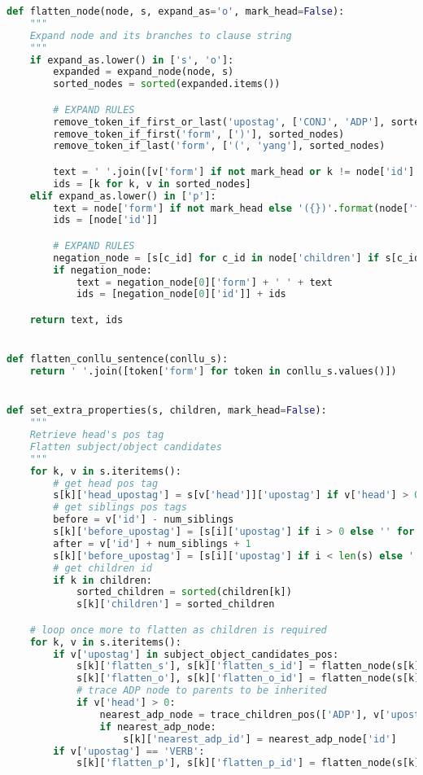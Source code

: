 \begin{lstlisting}[language=Python]
def flatten_node(node, s, expand_as='o', mark_head=False):
    """
    Expand node and its branches to clause string
    """
    if expand_as.lower() in ['s', 'o']:
        expanded = expand_node(node, s)
        sorted_nodes = sorted(expanded.items())

        # EXPAND RULES
        remove_token_if_first_or_last('upostag', ['CONJ', 'ADP'], sorted_nodes)
        remove_token_if_first('form', [')'], sorted_nodes)
        remove_token_if_last('form', ['(', 'yang'], sorted_nodes)

        text = ' '.join([v['form'] if not mark_head or k != node['id'] else '({})'.format(v['form']) for k, v in sorted_nodes])
        ids = [k for k, v in sorted_nodes]
    elif expand_as.lower() in ['p']:
        text = node['form'] if not mark_head else '({})'.format(node['form'])
        ids = [node['id']]

        # EXPAND RULES
        negation_node = [s[c_id] for c_id in node['children'] if s[c_id]['form'].lower() == 'tidak']
        if negation_node:
            text = negation_node[0]['form'] + ' ' + text
            ids = [negation_node[0]['id']] + ids

    return text, ids


def flatten_conllu_sentence(conllu_s):
    return ' '.join([token['form'] for token in conllu_s.values()])


def set_extra_properties(s, children, mark_head=False):
    """
    Retrieve head's pos tag
    Flatten subject/object candidates
    """
    for k, v in s.iteritems():
        # get head pos tag
        s[k]['head_upostag'] = s[v['head']]['upostag'] if v['head'] > 0 else ''
        # get siblings pos tags
        before = v['id'] - num_siblings
        s[k]['before_upostag'] = [s[i]['upostag'] if i > 0 else '' for i in range(before, v['id'])]
        after = v['id'] + num_siblings + 1
        s[k]['before_upostag'] = [s[i]['upostag'] if i < len(s) else '' for i in range(after - num_siblings, after)]
        # get children id
        if k in children:
            sorted_children = sorted(children[k])
            s[k]['children'] = sorted_children

    # loop once more to flatten as children is required
    for k, v in s.iteritems():
        if v['upostag'] in subject_object_candidates_pos:
            s[k]['flatten_s'], s[k]['flatten_s_id'] = flatten_node(s[k], s, expand_as='s', mark_head=mark_head)
            s[k]['flatten_o'], s[k]['flatten_o_id'] = flatten_node(s[k], s, expand_as='o', mark_head=mark_head)
            # trace ADP node to parents to be inherited
            if v['head'] > 0:
                nearest_adp_node = trace_children_pos(['ADP'], v['upostag'], v, s)
                if nearest_adp_node:
                    s[k]['nearest_adp_id'] = nearest_adp_node['id']
        if v['upostag'] == 'VERB':
            s[k]['flatten_p'], s[k]['flatten_p_id'] = flatten_node(s[k], s, expand_as='p', mark_head=mark_head)



\end{lstlisting}

